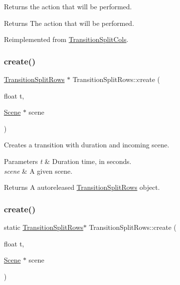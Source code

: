 Returns the action that will be performed.

\begin{DoxyReturn}{Returns}
The action that will be performed. 
\end{DoxyReturn}


Reimplemented from \hyperlink{classTransitionSplitCols_a8b6074132330415cb925e15378363462}{Transition\+Split\+Cols}.

\mbox{\label{classTransitionSplitRows_a01cdd1c976378d9e053e261ca806c038}} 
\subsubsection{\texorpdfstring{create()}{create()}\hspace{0.1cm}{\footnotesize\ttfamily [1/2]}}
{\footnotesize\ttfamily \hyperlink{classTransitionSplitRows}{Transition\+Split\+Rows} $\ast$ Transition\+Split\+Rows\+::create (\begin{DoxyParamCaption}\item[{float}]{t,  }\item[{\hyperlink{classScene}{Scene} $\ast$}]{scene }\end{DoxyParamCaption})\hspace{0.3cm}{\ttfamily [static]}}

Creates a transition with duration and incoming scene.


\begin{DoxyParams}{Parameters}
{\em t} & Duration time, in seconds. \\
\hline
{\em scene} & A given scene. \\
\hline
\end{DoxyParams}
\begin{DoxyReturn}{Returns}
A autoreleased \hyperlink{classTransitionSplitRows}{Transition\+Split\+Rows} object. 
\end{DoxyReturn}
\mbox{\label{classTransitionSplitRows_a0f00f59d8827a1979ea032eb5173df87}} 
\subsubsection{\texorpdfstring{create()}{create()}\hspace{0.1cm}{\footnotesize\ttfamily [2/2]}}
{\footnotesize\ttfamily static \hyperlink{classTransitionSplitRows}{Transition\+Split\+Rows}$\ast$ Transition\+Split\+Rows\+::create (\begin{DoxyParamCaption}\item[{float}]{t,  }\item[{\hyperlink{classScene}{Scene} $\ast$}]{scene }\end{DoxyParamCaption})\hspace{0.3cm}{\ttfamily [static]}}

